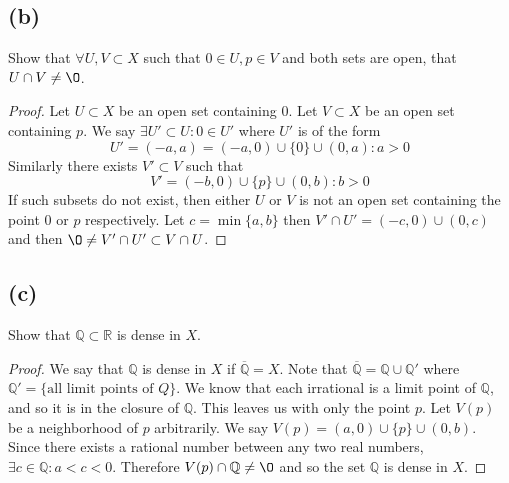 \documentclass{article}
\begin{document}
\subsection*{(b)}
Show that $\forall U,V \subset X$ such that $0 \in U, p \in V$ and both sets are open, that $U \cap V \neq \O$.
\begin{proof}
    Let $U \subset X$ be an open set containing $0$.
    Let $V \subset X$ be an open set containing $p$.
    We say $\exists U' \subset U : 0 \in U'$ where $U'$ is of the form 
    \[
        U' = (-a,a) = (-a,0) \cup \{0\} \cup (0,a) : a > 0
    \]
    Similarly there exists $V' \subset V$ such that
    \[
        V' = (-b,0) \cup \{p\} \cup (0,b) : b > 0
    \]
    If such subsets do not exist, then either $U$ or $V$ is not an open set containing the point $0$ or $p$ respectively.
    Let $c = \min \{a,b\}$ then $V' \cap U' = (-c, 0) \cup (0,c)$ and then $\O \neq V' \cap U' \subset V \cap U$.
\end{proof}
\subsection*{(c)}
Show that $\mathbb{Q} \subset \mathbb{R}$ is dense in $X$.
\begin{proof}
    We say that $\mathbb{Q}$ is dense in $X$ if $\overline{\mathbb{Q}} = X$.
    Note that $\overline{\mathbb{Q}} = \mathbb{Q} \cup \mathbb{Q}'$ where $\mathbb{Q}' = \{\text{all limit points of } Q\}$.
    We know that each irrational is a limit point of $\mathbb{Q}$, and so it is in the closure of $\mathbb{Q}$.
    This leaves us with only the point $p$.
    Let $V(p)$ be a neighborhood of $p$ arbitrarily.
    We say $V(p) = (a,0) \cup \{p\} \cup (0,b)$.
    Since there exists a rational number between any two real numbers, $\exists c \in \mathbb{Q} : a < c < 0$.
    Therefore $V(p) \cap \mathbb{Q} \neq \O$ and so the set $\mathbb{Q}$ is dense in $X$.
\end{proof}
\end{document}
